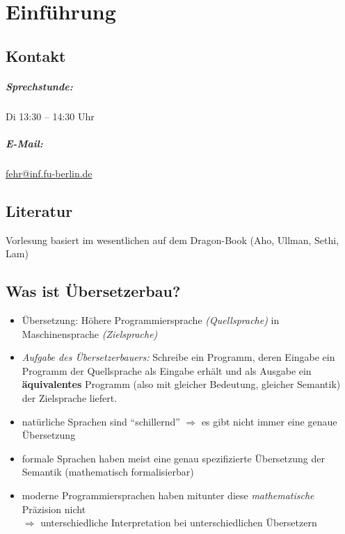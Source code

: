 \chapter{Einführung}
\section{Kontakt}
\paragraph{Sprechstunde:} Di 13:30 -- 14:30 Uhr
\paragraph{E-Mail:}	\href{mailto:fehr@inf.fu-berlin.de}{fehr@inf.fu-berlin.de}

\section{Literatur}
Vorlesung basiert im wesentlichen auf dem Dragon-Book (Aho, Ullman, Sethi, Lam)

\section{Was ist Übersetzerbau?}
\begin{itemize}
 \item Übersetzung: Höhere Programmiersprache \emph{(Quellsprache)} in Maschinensprache \emph{(Zielsprache)}
 \item \emph{Aufgabe des Übersetzerbauers:} Schreibe ein Programm, deren Eingabe ein Programm der Quellsprache als Eingabe erhält und als Ausgabe ein \textbf{äquivalentes} Programm (also mit gleicher Bedeutung, gleicher Semantik) der Zielsprache liefert.
 \item natürliche Sprachen sind "`schillernd"' $\Rightarrow$ es gibt nicht immer eine genaue Übersetzung
 \item formale Sprachen haben meist eine genau spezifizierte Übersetzung der Semantik (mathematisch formalisierbar)
 \item moderne Programmiersprachen haben mitunter diese \emph{mathematische} Präzision nicht \\
		$\Rightarrow$ unterschiedliche Interpretation bei unterschiedlichen Übersetzern
\end{itemize}


